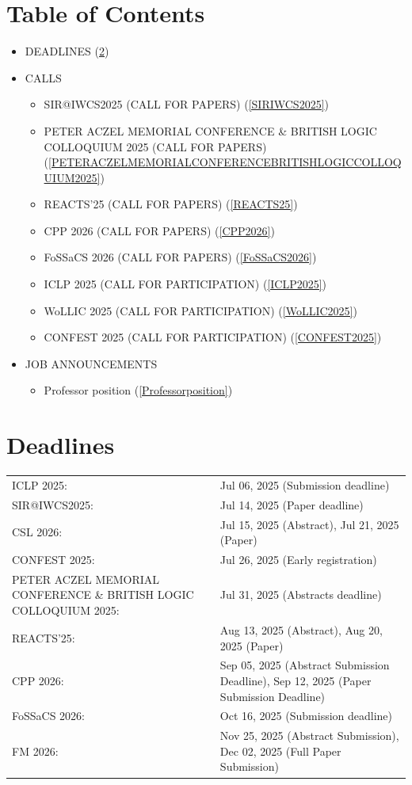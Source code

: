 \documentclass[prodmode,acmtecs]{acmsmall} %
\begin{document}
\section{Table of Contents}\begin{itemize}\item DEADLINES (\cref{deadlines}) 
 
\item CALLS 
 
\begin{itemize}\item SIR@IWCS2025 (CALL FOR PAPERS) (\cref{SIRIWCS2025})
\item PETER ACZEL MEMORIAL CONFERENCE \& BRITISH LOGIC COLLOQUIUM 2025 (CALL FOR PAPERS) (\cref{PETERACZELMEMORIALCONFERENCEBRITISHLOGICCOLLOQUIUM2025})
\item REACTS'25 (CALL FOR PAPERS) (\cref{REACTS25})
\item CPP 2026 (CALL FOR PAPERS) (\cref{CPP2026})
\item FoSSaCS 2026 (CALL FOR PAPERS) (\cref{FoSSaCS2026})
\item ICLP 2025 (CALL FOR PARTICIPATION) (\cref{ICLP2025})
\item WoLLIC 2025 (CALL FOR PARTICIPATION) (\cref{WoLLIC2025})
\item CONFEST 2025 (CALL FOR PARTICIPATION) (\cref{CONFEST2025})
\end{itemize} 
\item JOB ANNOUNCEMENTS 
 
\begin{itemize}\item Professor position (\cref{Professorposition})
\end{itemize} 
\end{itemize}\section{Deadlines}\label{deadlines}\begin{tabulary}{\linewidth}{LL}ICLP 2025:  & Jul 06, 2025 (Submission deadline) \\
SIR@IWCS2025:  & Jul 14, 2025 (Paper deadline) \\
CSL 2026:  & Jul 15, 2025 (Abstract), Jul 21, 2025 (Paper) \\
CONFEST 2025:  & Jul 26, 2025 (Early registration) \\
PETER ACZEL MEMORIAL CONFERENCE \& BRITISH LOGIC COLLOQUIUM 2025:  & Jul 31, 2025 (Abstracts deadline) \\
REACTS'25:  & Aug 13, 2025 (Abstract), Aug 20, 2025 (Paper) \\
CPP 2026:  & Sep 05, 2025 (Abstract Submission Deadline), Sep 12, 2025 (Paper Submission Deadline) \\
FoSSaCS 2026:  & Oct 16, 2025 (Submission deadline) \\
FM 2026:  & Nov 25, 2025 (Abstract Submission), Dec 02, 2025 (Full Paper Submission) \\
\end{tabulary}
\end{document}
